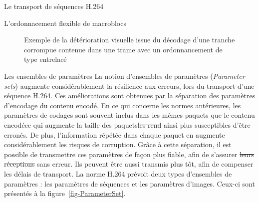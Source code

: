 \documentclass[letterpaper, twoside, 12pt,memoire]{thETS}
\newcommand{\ang}[1]{(\textit{#1})}
\newcommand{\fig}[1]{figure~\ref{#1}}
\providecommand{\DIFadd}[1]{{\protect\color{blue}\uwave{#1}}} %
\providecommand{\DIFdel}[1]{{\protect\color{red}\sout{#1}}}                      %
\providecommand{\DIFaddbegin}{} %
\providecommand{\DIFaddend}{} %
\providecommand{\DIFdelbegin}{} %
\providecommand{\DIFdelend}{} %
\providecommand{\DIFaddFL}[1]{\DIFadd{#1}} %
\providecommand{\DIFaddbeginFL}{} %
\providecommand{\DIFaddendFL}{} %
\begin{document}
\begin{chapter}{Le transport de séquences H.264}
\begin{section}{L'ordonnacement flexible de macroblocs}
\begin{figure}[htb]
\caption{Exemple de la détérioration visuelle issue du décodage d'une tranche
corrompue contenue dans une trame avec un ordonnancement de type entrelacé\DIFaddbeginFL \DIFaddFL{.}\DIFaddendFL }
\label{fig-ExempleEntrelace}
\end{figure}

\end{section}

\begin{section}{Les ensembles de paramètres}
\label{sect-ParameterSets}
La notion d'ensembles de paramètres \ang{Parameter sets} augmente
considérablement la résilience aux erreurs, lors du transport d'une séquence
H.264. Ces améliorations sont obtenues par la séparation des paramètres
d'encodage du contenu encodé. En ce qui concerne les normes antérieures, les
paramètres de codages sont souvent inclus dans les mêmes paquets que le contenu
encodé\DIFaddbegin \DIFadd{, }\DIFaddend ce qui augmente la taille des paquets\DIFdelbegin \DIFdel{les rend }\DIFdelend \DIFaddbegin \DIFadd{, les rendant }\DIFaddend ainsi plus susceptibles
d'être erronés. De plus, l'information répétée dans chaque paquet en augmente
considérablement les risques de corruption. Grâce à cette séparation, il est
possible de transmettre ces paramètres de façon plus fiable, afin de s'assurer
\DIFdelbegin \DIFdel{leurs réceptions }\DIFdelend \DIFaddbegin \DIFadd{leur réception }\DIFaddend sans erreur. Ils peuvent être aussi transmis plus tôt, afin de
compenser les délais de transport. La norme H.264 prévoit deux types d'ensembles
de paramètres : les paramètres de séquences et les paramètres d'images. Ceux-ci
sont présentés à la \fig{fig-ParameterSet}.


\end{section}
\end{chapter}
\end{document}
